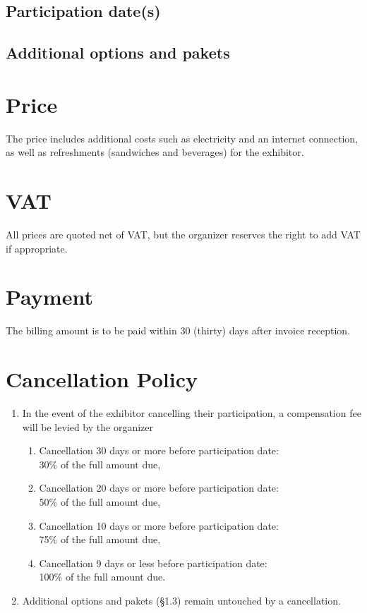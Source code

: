 \companyboothchoice\hfill\companyboothprice
\companyboothinfo

\subsection{Participation date(s)}

\companydatechoice

\subsection{Additional options and pakets}

\companyextrachoice

\section{Price}

The price includes additional costs such as electricity and an internet connection, as
well as refreshments (sandwiches and beverages) for the exhibitor.

\section{VAT}

All prices are quoted net of VAT, but the organizer reserves the right to add VAT if appropriate.

\section{Payment}

The billing amount is to be paid within 30 (thirty) days after invoice reception.

\section{Cancellation Policy}
\begin{enumerate}
	\item In the event of the exhibitor cancelling their participation, a compensation fee will be levied by the organizer
	\begin{enumerate}
		\item Cancellation 30 days or more before participation date:\\
			30\% of the full amount due,
		\item Cancellation 20 days or more before participation date:\\
			50\% of the full amount due,
		\item Cancellation 10 days or more before participation date:\\
			75\% of the full amount due,
		\item Cancellation 9 days or less before participation date:\\
			100\% of the full amount due.
	\end{enumerate}

	\item Additional options and pakets (\S 1.3) remain untouched by a cancellation.
\end{enumerate}

